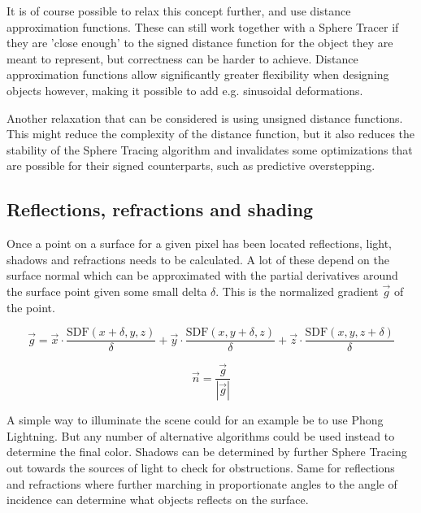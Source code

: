 			It is of course possible to relax this concept further, and use
			distance approximation functions. These can still work together 
			with a Sphere Tracer if they are 'close enough' to the signed 
			distance function for the object they are meant to represent, but
			correctness can be harder to achieve. Distance approximation 
			functions allow significantly greater flexibility when designing 
			objects however, making it possible to add e.g. sinusoidal 
			deformations\cite{Quilez, Keinert}.

			Another relaxation that can be considered is using unsigned 
			distance functions. This might reduce the complexity of the 
			distance function, but it also reduces the stability of the Sphere
			Tracing algorithm and invalidates some optimizations that are 
			possible for their signed counterparts, such as predictive 
			overstepping\cite{Korndorfer2014}.

		\subsection{Reflections, refractions and shading}

			Once a point on a surface for a given pixel has been located
			reflections, light, shadows and refractions needs to be calculated.
			A lot of these depend on the surface normal which can be
			approximated with the partial derivatives around the surface point
			given some small delta $\delta$. This is the normalized gradient
			$\vec{g}$ of the point.

			$$\vec{g} = \vec{x}\cdot\frac{\text{SDF}(x+\delta, y, z)}{\delta} +
			\vec{y}\cdot\frac{\text{SDF}(x, y+\delta, z)}{\delta} +
			\vec{z}\cdot\frac{\text{SDF}(x, y, z+\delta)}{\delta} $$

			$$\vec{n} = \frac{\vec{g}}{|\vec{g}|} $$

			A simple way to illuminate the scene could for an example be to use
			Phong Lightning\cite{Phong1975}. But any number of alternative
			algorithms could be used instead to determine the final color.
			Shadows can be determined by further Sphere Tracing out towards the
			sources of light to check for obstructions. Same for reflections
			and refractions where further marching in proportionate angles to
			the angle of incidence can determine what objects reflects on the
			surface.
